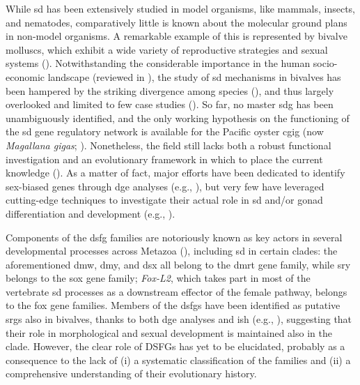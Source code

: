 While \gls{sd} has been extensively studied in model organisms, like mammals, insects, and nematodes, comparatively little is known about the molecular ground plans in non-model organisms. A remarkable example of this is represented by bivalve molluscs, which exhibit a wide variety of reproductive strategies and sexual systems (\textbf{\cite{breton2018sex}}). Notwithstanding the considerable importance in the human socio-economic landscape (reviewed in \textbf{\cite{haszprunar2012molluscs, gomes2020molluscan}}), the study of \gls{sd} mechanisms in bivalves has been hampered by the striking divergence among species (\textbf{\cite{li2022sex}}), and thus largely overlooked and limited to few case studies (\textbf{\cite{breton2018sex, nicolini2023bivalves}}). So far, no master \gls{sdg} has been unambiguously identified, and the only working hypothesis on the functioning of the \gls{sd} gene regulatory network is available for the Pacific oyster \gls{cgig} (now \textit{Magallana gigas}; \textbf{\cite{zhang2014genomic}}). Nonetheless, the field still lacks both a robust functional investigation and an evolutionary framework in which to place the current knowledge (\textbf{\cite{nicolini2023bivalves}}). As a matter of fact, major efforts have been dedicated to identify sex-biased genes through \gls{dge} analyses (e.g., \textbf{\cite{milani2013nuclear, teaniniuraitemoana2014gonad, zhang2014genomic, capt2018deciphering, afonso2019gonad}}), but very few have leveraged cutting-edge techniques to investigate their actual role in \gls{sd} and/or gonad differentiation and development (e.g., \textbf{\cite{liang2019sox2, sun2022examination}}).

Components of the \gls{dsfg} families are notoriously known as key actors in several developmental processes across Metazoa (\textbf{\cite{benayoun2011forkhead, matson2012sex, sarkar2013sox, mawaribuchi2019independent}}), including \gls{sd} in certain clades: the aforementioned \gls{dmw}, \gls{dmy}, and \gls{dsx} all belong to the \gls{dmrt} gene family, while \gls{sry} belongs to the \gls{sox} gene family; \textit{Fox-L2}, which takes part in most of the vertebrate \gls{sd} processes as a downstream effector of the female pathway, belongs to the \gls{fox} gene families. Members of the \glspl{dsfg} have been identified as putative \glspl{srg} also in bivalves, thanks to both \gls{dge} analyses and \gls{ish} (e.g., \textbf{\cite{naimi2009molecular, li2018foxl2, liang2019sox2, yue2021variance}}), suggesting that their role in morphological and sexual development is maintained also in the clade. However, the clear role of DSFGs has yet to be elucidated, probably as a consequence to the lack of (i) a systematic classification of the families and (ii) a comprehensive understanding of their evolutionary history.

